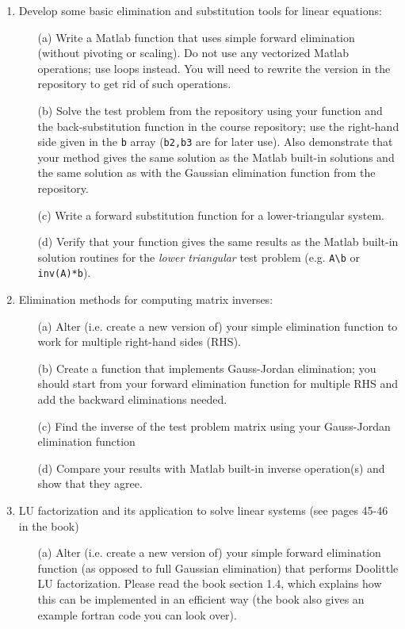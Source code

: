 \documentclass{article}
\begin{document}
\pagebreak

\begin{enumerate}
  \item Develop some basic elimination and substitution tools for linear equations:   
  \begin{itemize}
    \item[(a)] Write a Matlab function that uses simple forward elimination (without pivoting or scaling).  Do not use any vectorized Matlab operations; use loops instead.  You will need to rewrite the version in the repository to get rid of such operations.  
    \item[(b)] Solve the test problem from the repository using your function and the back-substitution function in the course repository; use the right-hand side given in the \texttt{b} array (\texttt{b2,b3} are for later use).   Also demonstrate that your method gives the same solution as the Matlab built-in solutions and the same solution as with the Gaussian elimination function from the repository. 
    \item[(c)] Write a forward substitution function for a lower-triangular system.  
    \item[(d)] Verify that your function gives the same results as the Matlab built-in solution routines for the \emph{lower triangular} test problem (e.g. \texttt{A\textbackslash b} or \texttt{inv(A)*b}).  
  \end{itemize}
  \item Elimination methods for computing matrix inverses:  
  \begin{itemize}
    \item[(a)] Alter (i.e. create a new version of) your simple elimination function to work for multiple right-hand sides (RHS).  
    \item[(b)] Create a function that implements Gauss-Jordan elimination; you should start from your forward elimination function for multiple RHS and add the backward eliminations needed.  
    \item[(c)] Find the inverse of the test problem matrix using your Gauss-Jordan elimination function
    \item[(d)] Compare your results with Matlab built-in inverse operation(s) and show that they agree.
  \end{itemize}
  \item LU factorization and its application to solve linear systems (see pages 45-46 in the book)
  \begin{itemize}
    \item[(a)] Alter (i.e. create a new version of) your simple forward elimination function (as opposed to full Gaussian elimination) that performs Doolittle LU factorization.  Please read the book section 1.4, which explains how this can be implemented in an efficient way (the book also gives an example fortran code you can look over).  

\end{itemize}
\end{enumerate}
\end{document}
